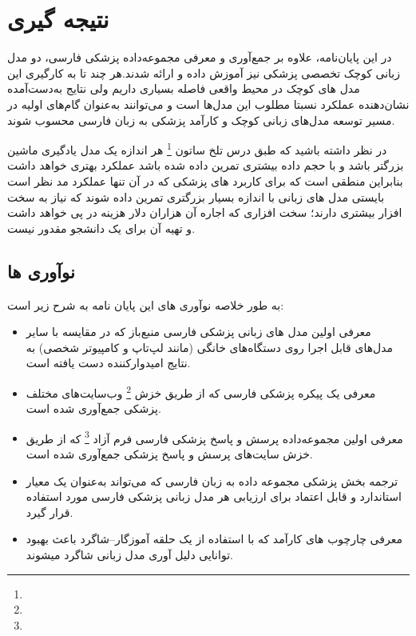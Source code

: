 
\chapter{نتیجه گیری}
در این پایان‌نامه، علاوه بر جمع‌آوری و معرفی مجموعه‌داده پزشکی فارسی، دو مدل زبانی کوچک تخصصی پزشکی نیز آموزش داده و ارائه شدند.هر چند تا به کارگیری این مدل های کوچک در محیط واقعی فاصله بسیاری داریم ولی نتایج به‌دست‌آمده نشان‌دهنده عملکرد نسبتا مطلوب این مدل‌ها است و می‌توانند به‌عنوان گام‌های اولیه در مسیر توسعه مدل‌های زبانی کوچک و کارآمد پزشکی به زبان فارسی محسوب شوند.

در نظر داشته باشید که طبق درس تلخ ساتون
\footnote{}
هر اندازه یک مدل یادگیری ماشین بزرگتر باشد و با حجم داده بیشتری تمرین داده شده باشد عملکرد بهتری خواهد داشت بنابراین منطقی است که برای کاربرد های پزشکی که در آن تنها عملکرد مد نظر است بایستی مدل های زبانی با اندازه بسیار بزرگتری تمرین داده شوند که نیاز به سخت افزار بیشتری دارند؛ سخت افزاری که اجاره آن هزاران دلار هزینه در پی خواهد داشت و تهیه آن برای یک دانشجو مقدور نیست.

\section{نوآوری ها}

به طور خلاصه نوآوری های این پایان نامه به شرح زیر است:

\begin{itemize}
    \item 
    معرفی اولین مدل های زبانی پزشکی فارسی منبع‌باز که در مقایسه با سایر مدل‌های قابل اجرا روی دستگاه‌های خانگی (مانند لپ‌تاپ و کامپیوتر شخصی) به نتایج امیدوارکننده دست یافته است.
    \item 
    معرفی یک پیکره پزشکی فارسی که از طریق خزش
    \footnote{}
    وب‌سایت‌های مختلف پزشکی جمع‌آوری شده است.
    \item
    معرفی اولین مجموعه‌داده پرسش و پاسخ پزشکی فارسی فرم آزاد
    \footnote{}
        که از طریق خزش سایت‌های پرسش و پاسخ پزشکی جمع‌آوری شده است.
    
    \item
    ترجمه بخش پزشکی مجموعه داده
    به زبان فارسی که می‌تواند به‌عنوان یک معیار استاندارد و قابل اعتماد برای ارزیابی هر مدل زبانی پزشکی فارسی مورد استفاده قرار گیرد.
    \item
    معرفی چارچوب های کارآمد که با استفاده از یک حلقه آموزگار–شاگرد باعث بهبود توانایی دلیل آوری مدل زبانی شاگرد میشوند.
\end{itemize}


